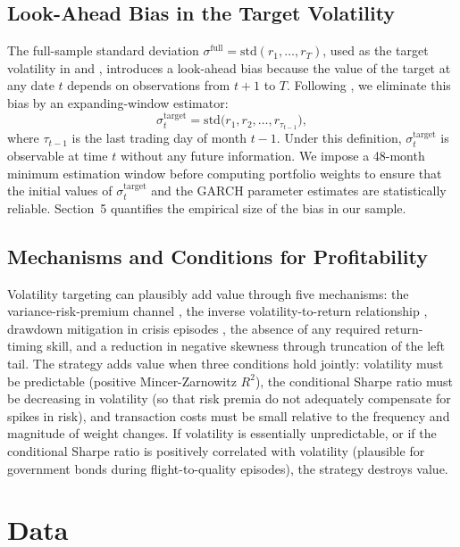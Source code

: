 \documentclass[12pt, a4paper]{article}
\newcommand{\stgt}{\sigma^{\mathrm{target}}}
\begin{document}
\subsection{Look-Ahead Bias in the Target Volatility}

The full-sample standard deviation $\sigma^{\mathrm{full}}=\mathrm{std}(r_1,\ldots,r_T)$,
used as the target volatility in \citet{moreira2017} and \citet{harvey2018}, introduces a
look-ahead bias because the value of the target at any date $t$ depends on observations
from $t+1$ to $T$. Following \citet{bongaerts2020}, we eliminate this bias by an
expanding-window estimator:
\begin{equation}
\stgt_t = \mathrm{std}\bigl(r_1, r_2, \ldots, r_{\tau_{t-1}}\bigr),
\label{eq:target}
\end{equation}
where $\tau_{t-1}$ is the last trading day of month $t-1$. Under this definition,
$\stgt_t$ is observable at time $t$ without any future information. We impose a 48-month
minimum estimation window before computing portfolio weights to ensure that the initial
values of $\stgt_t$ and the GARCH parameter estimates are statistically reliable. Section~5
quantifies the empirical size of the bias in our sample.

\subsection{Mechanisms and Conditions for Profitability}

Volatility targeting can plausibly add value through five mechanisms: the
variance-risk-premium channel \citep{moreira2017}, the inverse volatility-to-return
relationship \citep{harvey2018}, drawdown mitigation in crisis episodes \citep{bongaerts2020},
the absence of any required return-timing skill, and a reduction in negative skewness through
truncation of the left tail. The strategy adds value when three conditions hold jointly:
volatility must be predictable (positive Mincer-Zarnowitz $R^2$), the conditional Sharpe
ratio must be decreasing in volatility (so that risk premia do not adequately compensate
for spikes in risk), and transaction costs must be small relative to the frequency and
magnitude of weight changes. If volatility is essentially unpredictable, or if the
conditional Sharpe ratio is positively correlated with volatility (plausible for government
bonds during flight-to-quality episodes), the strategy destroys value.

\section{Data}
\end{document}

